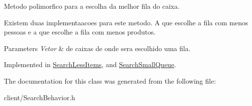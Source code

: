 Metodo polimorfico para a escolha da melhor fila do caixa. 

Existem duas implementaacoes para este metodo. A que escolhe a fila com menos pessoas e a que escolhe a fila com menos produtos.


\begin{DoxyParams}{Parameters}
{\em Vetor} & de caixas de onde sera escolhido uma fila. \\
\hline
\end{DoxyParams}


Implemented in \hyperlink{classSearchLessItems_a1ae7ed499cbee0e61edfc5d6778226c0}{Search\-Less\-Items}, and \hyperlink{classSearchSmallQueue_a0ea1eba216b5f265a10dd59287d56311}{Search\-Small\-Queue}.



The documentation for this class was generated from the following file\-:\begin{DoxyCompactItemize}
\item 
client/Search\-Behavior.\-h\end{DoxyCompactItemize}

